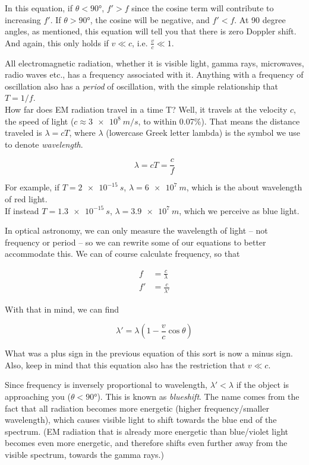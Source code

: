 \documentclass[8.01x]{subfiles}
\begin{document}
In this equation, if $\theta < \ang{90}$, $f' > f$ since the cosine term will contribute to increasing $f'$. If $\theta > \ang{90}$, the cosine will be negative, and $f' < f$. At 90 degree angles, as mentioned, this equation will tell you that there is zero Doppler shift. And again, this only holds if $v \ll c$, i.e. $\displaystyle \frac{v}{c} \ll 1$.

All electromagnetic radiation, whether it is visible light, gamma rays, microwaves, radio waves etc., has a frequency associated with it. Anything with a frequency of oscillation also has a \emph{period} of oscillation, with the simple relationship that $T = 1/f$.\\
How far does EM radiation travel in a time T? Well, it travels at the velocity $c$, the speed of light ($c \approx \SI{3e8}{m/s}$, to within 0.07\%). That means the distance traveled is $\lambda = c T$, where $\lambda$ (lowercase Greek letter lambda) is the symbol we use to denote \emph{wavelength}.

\begin{equation}
\lambda = c T = \frac{c}{f}
\end{equation}

For example, if $T = \SI{2e-15}{s}$, $\lambda = \SI{6e7}{m}$, which is the about wavelength of red light.\\
If instead $T = \SI{1.3e-15}{s}$, $\lambda = \SI{3.9e7}{m}$, which we perceive as blue light.

In optical astronomy, we can only measure the wavelength of light -- not frequency or period -- so we can rewrite some of our equations to better accommodate this. We can of course calculate frequency, so that

\begin{align}
f  &= \frac{c}{\lambda}\\
f' &= \frac{c}{\lambda'}
\end{align}

With that in mind, we can find

\begin{equation}
\lambda' = \lambda(1 - \frac{v}{c} \cos \theta)
\end{equation}

What was a plus sign in the previous equation of this sort is now a minus sign. Also, keep in mind that this equation also has the restriction that $v \ll c$.

Since frequency is inversely proportional to wavelength, $\lambda' < \lambda$ if the object is approaching you ($\theta < \ang{90}$). This is known as \emph{blueshift}. The name comes from the fact that all radiation becomes more energetic (higher frequency/smaller wavelength), which causes visible light to shift towards the blue end of the spectrum. (EM radiation that is already more energetic than blue/violet light becomes even more energetic, and therefore shifts even further away from the visible spectrum, towards the gamma rays.)
\end{document}
